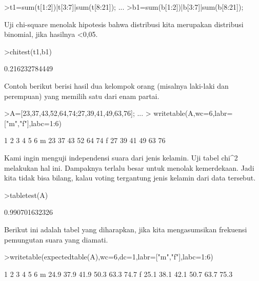 \documentclass[a4paper,10pt]{article}
\begin{document}
\begin{eulernotebook}
\begin{eulercomment}
\begin{eulercomment}
\begin{eulerprompt}
>t1=sum(t[1:2])|t[3:7]|sum(t[8:21]); ...
>b1=sum(b[1:2])|b[3:7]|sum(b[8:21]);
\end{eulerprompt}
\begin{eulercomment}
Uji chi-square menolak hipotesis bahwa distribusi kita merupakan
distribusi binomial, jika hasilnya \textless{}0,05.
\end{eulercomment}
\begin{eulerprompt}
>chitest(t1,b1)
\end{eulerprompt}
\begin{euleroutput}
  0.216232784449
\end{euleroutput}
\begin{eulercomment}
Contoh berikut berisi hasil dua kelompok orang (misalnya laki-laki dan
perempuan) yang memilih satu dari enam partai.
\end{eulercomment}
\begin{eulerprompt}
>A=[23,37,43,52,64,74;27,39,41,49,63,76];  ...
>  writetable(A,wc=6,labr=["m","f"],labc=1:6)
\end{eulerprompt}
\begin{euleroutput}
             1     2     3     4     5     6
       m    23    37    43    52    64    74
       f    27    39    41    49    63    76
\end{euleroutput}
\begin{eulercomment}
Kami ingin menguji independensi suara dari jenis kelamin. Uji tabel
chi\textasciicircum{}2 melakukan hal ini. Dampaknya terlalu besar untuk menolak
kemerdekaan. Jadi kita tidak bisa bilang, kalau voting tergantung
jenis kelamin dari data tersebut.
\end{eulercomment}
\begin{eulerprompt}
>tabletest(A)
\end{eulerprompt}
\begin{euleroutput}
  0.990701632326
\end{euleroutput}
\begin{eulercomment}
Berikut ini adalah tabel yang diharapkan, jika kita mengasumsikan
frekuensi pemungutan suara yang diamati.
\end{eulercomment}
\begin{eulerprompt}
>writetable(expectedtable(A),wc=6,dc=1,labr=["m","f"],labc=1:6)
\end{eulerprompt}
\begin{euleroutput}
             1     2     3     4     5     6
       m  24.9  37.9  41.9  50.3  63.3  74.7
       f  25.1  38.1  42.1  50.7  63.7  75.3
\end{euleroutput}

\end{eulercomment}
\end{eulercomment}
\end{eulernotebook}
\end{document}
